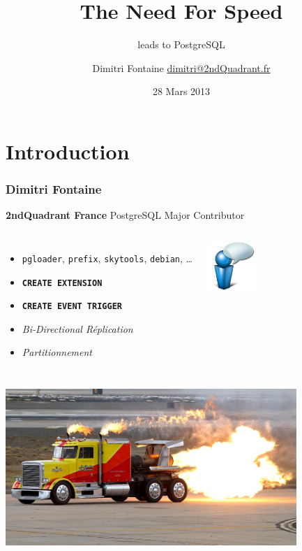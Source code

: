 \documentclass{beamer}
\title{The Need For Speed}
\subtitle{leads to PostgreSQL}
\author{Dimitri Fontaine \url{dimitri@2ndQuadrant.fr}}
\date{28 Mars 2013}
\begin{document}
\frame{\titlepage}

\section{Introduction}

\begin{frame}[fragile]
  \frametitle{Dimitri Fontaine}

  \begin{center}
    \textbf{2ndQuadrant France}
    \linebreak
    PostgreSQL Major Contributor
  \end{center}
  \vfill

\begin{columns}[c]

  \begin{itemize}
   \item \texttt{pgloader}, \texttt{prefix}, \texttt{skytools}, \texttt{debian}, …
   \item \texttt{\textbf{CREATE EXTENSION}}
   \item \texttt{\textbf{CREATE EVENT TRIGGER}}
   \item \textit{Bi-Directional Réplication}
   \item \textit{Partitionnement}
  \end{itemize}  

\begin{center}
  \includegraphics[height=5em]{bulle-blue-icon.png}
\end{center}
\end{columns}
\end{frame}

\begin{frame}[fragile]


\end{frame}

\begin{frame}[fragile]
\begin{center}
  \includegraphics[height=16em]{fast-truck.jpg}
\end{center}
\end{frame}
\end{document}
